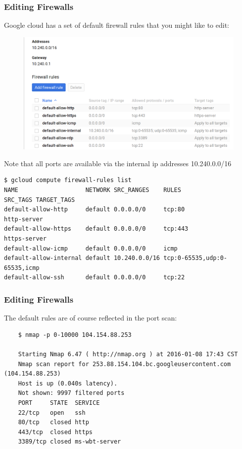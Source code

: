 \documentclass[9pt]{beamer}
\begin{document}
\begin{frame}[fragile]
  \frametitle{Editing Firewalls}
  Google cloud has a set of default firewall rules that you might like to edit:
  \begin{figure}
    \includegraphics[scale=0.2]{figures/DefaultFirewall.png}
  \end{figure}
\end{frame}

\begin{frame}[fragile]
Note that all ports are available via the internal ip addresses 10.240.0.0/16
  \begin{verbatim}
$ gcloud compute firewall-rules list
NAME                   NETWORK SRC_RANGES    RULES                        SRC_TAGS TARGET_TAGS
default-allow-http     default 0.0.0.0/0     tcp:80                                http-server
default-allow-https    default 0.0.0.0/0     tcp:443                               https-server
default-allow-icmp     default 0.0.0.0/0     icmp
default-allow-internal default 10.240.0.0/16 tcp:0-65535,udp:0-65535,icmp
default-allow-ssh      default 0.0.0.0/0     tcp:22    
  \end{verbatim}

\end{frame}

\begin{frame}[fragile]
  \frametitle{Editing Firewalls}
  The default rules are of course reflected in the port scan:
  \begin{verbatim}
    $ nmap -p 0-10000 104.154.88.253

    Starting Nmap 6.47 ( http://nmap.org ) at 2016-01-08 17:43 CST
    Nmap scan report for 253.88.154.104.bc.googleusercontent.com (104.154.88.253)
    Host is up (0.040s latency).
    Not shown: 9997 filtered ports
    PORT     STATE  SERVICE
    22/tcp   open   ssh
    80/tcp   closed http
    443/tcp  closed https
    3389/tcp closed ms-wbt-server
  \end{verbatim}
\end{frame}
\end{document}

